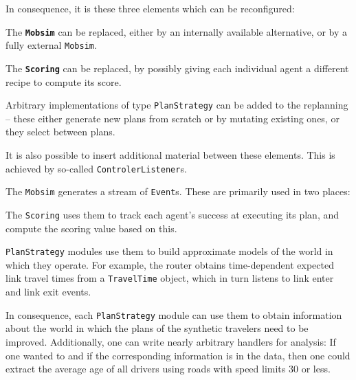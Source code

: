 In consequence, it is these three elements which can be reconfigured:
\begin{compactitem}

\item The \textbf{\tt Mobsim} can be replaced, either by an internally available alternative, or by a fully external \verb$Mobsim$.


\item The \textbf{\tt Scoring} can be replaced, by possibly giving each individual agent a different recipe to compute its score.

\item Arbitrary implementations of type \verb$PlanStrategy$ can be added to the replanning -- these either generate new plans from scratch or by mutating existing ones, or they select between plans.

\end{compactitem}
It is also possible to insert additional material between these elements.  This is achieved by so-called \verb$ControlerListener$s.

The \verb$Mobsim$ generates a stream of \verb$Event$s.  These are primarily used in two places:
\begin{compactitem}

\item The \verb$Scoring$ uses them to track each agent's success at executing its plan, and compute the scoring value based on this.

\item \verb$PlanStrategy$ modules use them to build approximate models of the world in which they operate.  For example, the router obtains time-dependent expected link travel times from a \verb$TravelTime$ object, which in turn listens to link enter and link exit events.
  
\end{compactitem}
In consequence, each \verb$PlanStrategy$ module can use them to obtain information about the world in which the plans of the synthetic travelers need to be improved. Additionally, one can write nearly arbitrary handlers for analysis: If one wanted to and if the corresponding information is in the data, then one could extract the average age of all drivers using roads with speed limits 30 or less.


